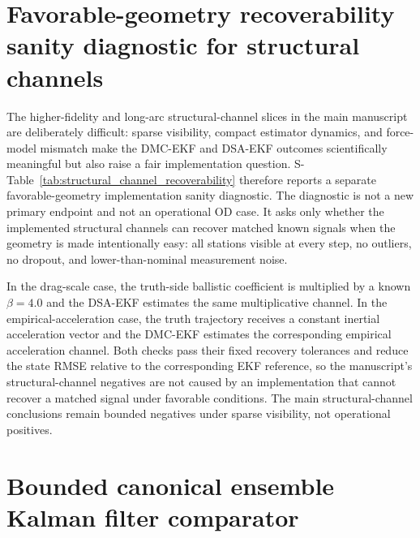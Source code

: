 \documentclass{article}
\begin{document}


\section{Favorable-geometry recoverability sanity diagnostic for structural channels}
\label{app:structural-channel-recoverability}

The higher-fidelity and long-arc structural-channel slices in the main manuscript are deliberately difficult: sparse visibility, compact estimator dynamics, and force-model mismatch make the DMC-EKF and DSA-EKF outcomes scientifically meaningful but also raise a fair implementation question. S-Table~\ref{tab:structural_channel_recoverability} therefore reports a separate favorable-geometry implementation sanity diagnostic. The diagnostic is not a new primary endpoint and not an operational OD case. It asks only whether the implemented structural channels can recover matched known signals when the geometry is made intentionally easy: all stations visible at every step, no outliers, no dropout, and lower-than-nominal measurement noise.

In the drag-scale case, the truth-side ballistic coefficient is multiplied by a known $\beta=4.0$ and the DSA-EKF estimates the same multiplicative channel. In the empirical-acceleration case, the truth trajectory receives a constant inertial acceleration vector and the DMC-EKF estimates the corresponding empirical acceleration channel. Both checks pass their fixed recovery tolerances and reduce the state RMSE relative to the corresponding EKF reference, so the manuscript's structural-channel negatives are not caused by an implementation that cannot recover a matched signal under favorable conditions. The main structural-channel conclusions remain bounded negatives under sparse visibility, not operational positives.



\section{Bounded canonical ensemble Kalman filter comparator}
\label{app:enkf-comparator}
\end{document}
